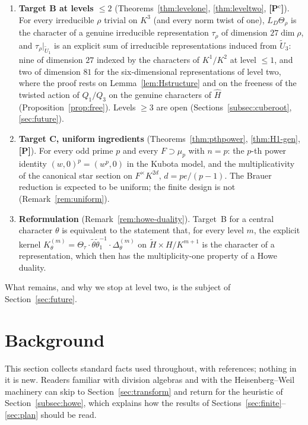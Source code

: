\documentclass[11pt]{article}
\newcommand{\tH}{\widetilde H}
\newcommand{\tU}{\widetilde U}
\newcommand{\tth}{\widetilde\theta}
\newcommand{\Ptag}{\textnormal{\textbf{[P]}}}
\newcommand{\Pctag}{\textnormal{\textbf{[P$^{\mathrm c}$]}}}
\theoremstyle{plain}
\theoremstyle{definition}
\begin{document}
\begin{enumerate}[leftmargin=*]
transform of $\Theta_\rho$ (Lemma~\ref{lem:product}).
\item \textbf{Target B at levels $\le2$}
(Theorems~\ref{thm:levelone}, \ref{thm:leveltwo}, \Pctag).  For every
irreducible $\rho$ trivial on $K^3$ (and every norm twist of one),
$L_D\Theta_\rho$ is the character of a genuine irreducible
representation $\tau_\rho$ of dimension $27\dim\rho$, and
$\tau_\rho|_{\tU_1}$ is an explicit sum of irreducible representations
induced from $\tU_3$: nine of dimension $27$ indexed by the characters
of $K^1/K^2$ at level $\le1$, and two of dimension $81$ for the
six-dimensional representations of level two, where the proof rests on
Lemma~\ref{lem:Hstructure} and on the freeness of the twisted action of
$Q_1/Q_3$ on the genuine characters of $\hat H$
(Proposition~\ref{prop:free}).  Levels $\ge3$ are open
(Sections~\ref{subsec:cuberoot}, \ref{sec:future}).
\item \textbf{Target C, uniform ingredients}
(Theorems~\ref{thm:pthpower}, \ref{thm:H1-gen}, \Ptag).  For every odd
prime $p$ and every $F\supset\mu_p$ with $n=p$: the $p$-th power identity
$(w,0)^p=(w^p,0)$ in the Kubota model, and the multiplicativity of the
canonical star section on $F^\times K^{2d}$, $d=pe/(p-1)$.  The Brauer
reduction is expected to be uniform; the finite design is not
(Remark~\ref{rem:uniform}).
\item \textbf{Reformulation} (Remark~\ref{rem:howe-duality}).  Target~B
for a central character $\theta$ is equivalent to the statement that,
for every level $m$, the explicit kernel
$K^{(m)}_\theta=\Theta_\tau\cdot\tth\tth_1^{-1}\cdot\Delta^{(m)}_\theta$ on
$\tH\times H/K^{m+1}$ is the character of a representation, which then
has the multiplicity-one property of a Howe duality.
\end{enumerate}
What remains, and why we stop at level two, is the subject of
Section~\ref{sec:future}.

\section{Background}\label{sec:background}
This section collects standard facts used throughout, with references;
nothing in it is new.  Readers familiar with division algebras and with
the Heisenberg--Weil machinery can skip to Section~\ref{sec:transform}
and return for the heuristic of Section~\ref{subsec:howe}, which explains
how the results of Sections~\ref{sec:finite}--\ref{sec:plan} should be
read.
\end{document}
